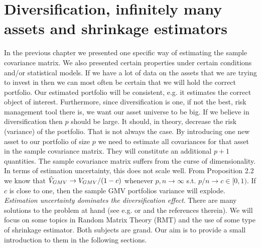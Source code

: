 \documentclass[oneside]{book}\usepackage{knitr}
\begin{document}
\chapter[Diversification \& shrinkage]{Diversification, infinitely many assets and shrinkage estimators}\label{ch:highdim}


In the previous chapter we presented one specific way of estimating the sample covariance matrix.
We also presented certain properties under certain conditions and/or statistical models.
If we have a lot of data on the assets that we are trying to invest in then we can most often be certain that we will hold the correct portfolio.
Our estimated portfolio will be consistent, e.g. it estimates the correct object of interest. 
Furthermore, since diversification is one, if not the best, risk management tool there is, we want our asset universe to be big.
If we believe in diversification then $p$ should be large. 
It should, in theory, decrease the risk (variance) of the portfolio. 
That is not always the case.
By introducing one new asset to our portfolio of size $p$ we need to estimate all covariances for that asset in the sample covariance matrix. 
They will constitute an additional $p+1$ quantities. 
The sample covariance matrix suffers from the curse of dimensionality. 
In terms of estimation uncertainty, this does not scale well.
From \citet{bodnar2016optimal} Proposition 2.2 we know that $\hat{V}_{GMV} \rightarrow V_{GMV}/(1-c)$ whenever $p,n \rightarrow \infty$ s.t. $p/n \rightarrow c \in [0,1)$. If $c$ is close to one, then the sample GMV portfolios variance will explode. \textit{Estimation uncertainty dominates the diversification effect}. There are many solutions to the problem at hand (see e.g. \citet{lw17} or \citet{bodnar2021recent} and the references therein). We will focus on some topics in Random Matrix Theory (RMT) and the use of some type of shrinkage estimator. Both subjects are grand. Our aim is to provide a small introduction to them in the following sections.
\end{document}
